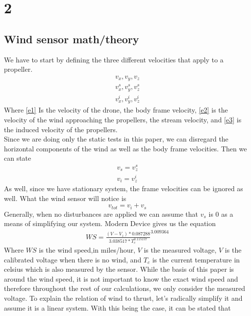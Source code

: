 \documentclass[conference]{IEEEtran}
\begin{document}
	\section{2}
	\subsection{Wind sensor math/theory}
	We have to start by defining the three different velocities that apply to a propeller.\\
	\begin{eqnarray}
	\label{e1}
	v_x , v_y , v_z \\
	\label{e2}
	v^s_{x} , v^s_{y} , v^s_{z} \\
	\label{e3}
	v^i_{x} , v^i_{y} , v^i_{z}
	\end{eqnarray}
	Where \ref{e1} Is the velocity of the drone, the body frame velocity, \ref{e2} is the velocity of the wind approaching the propellers, the stream velocity, and \ref{e3} is the induced velocity of the propellers.\\
	Since we are doing only the static tests in this paper, we can disregard the horizontal components of the wind as well as the body frame velocities. Then we can state 
	\begin{eqnarray}
	\nonumber
	v_s = v^s_{z}\\
	\nonumber
	v_i = v^i_{z}
	\end{eqnarray}
	As well, since we have stationary system, the frame velocities can be ignored as well. What the wind sensor will notice is 
	\begin{equation}
	v_{tot} = v_{i} + v_{s}
	\label{vtot}
	\end{equation}	
	Generally, when no disturbances are applied we can assume that $v_s$ is $0$ as a means of simplifying our system.
	Modern Device \cite{md} gives us the equation 
	\begin{eqnarray}
		WS = \frac{(V - V_{z})*0.087288}{3.038517 * T_{c} ^{0.115157}} ^ {3.009364}
		\label{wind_speed}
	\end{eqnarray}
	Where $WS$ is the wind speed,in miles/hour, $V$ is the measured voltage, $V$ is the calibrated voltage when there is no wind, and $T_c$ is the current temperature in celsius which is also measured by the sensor. While the basis of this paper is around the wind speed, it is not important to know the exact wind speed and therefore throughout the rest of our calculations, we only consider the measured voltage. 
	To explain the relation of wind to thrust, let's radically simplify it and assume it is a linear system.  With this being the case, it can be stated that 
\end{document}
